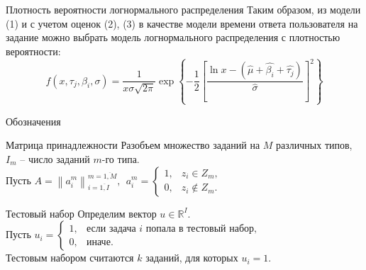 \documentclass[aspectratio=169]{beamer}
\newcommand{\norm}[1]{\left\lVert#1\right\rVert}
\begin{document}
    \begin{frame}{Плотность вероятности логнормального распределения}
            Таким образом, из модели (1) и с учетом оценок (2), (3) в качестве модели времени ответа пользователя на задание можно выбрать модель логнормального распределения с плотностью вероятности:
            \begin{equation}
                f(x,\tau_j,\beta_i,\sigma) = \dfrac{1}{x\sigma \sqrt{2\pi}}\exp \left\{ -\dfrac{1}{2} \left[ \dfrac{\ln x - (\hat{\mu} + \hat{\beta_i} + \hat{\tau_j})}{\hat{\sigma}} \right]^2 \right\}  
            \end{equation}
    \end{frame}


    \begin{frame}{Обозначения}
        \begin{block}{Матрица принадлежности}
            Разобъем множество заданий на $M$ различных типов, $I_m$ -- число заданий $m$-го типа.\\
            Пусть $A = \norm{ a_i^m }_{i=\overline{1,I}}^{m=\overline{1,M}},~~a_i^m =
                \begin{cases}
                    1, &z_i \in Z_m,\\
                    0, &z_i \notin Z_m.
                \end{cases}$
        \end{block}
    
        \begin{block}{Тестовый набор}
            Определим вектор $u\in\mathbb{R}^I$.\\
            Пусть $u_i =
                \begin{cases}
                    1, &\text{если задача $i$ попала в тестовый набор,}\\
                    0, &\text{иначе.}
                \end{cases}$\\
            Тестовым набором считаются $k$ заданий, для которых $u_i=1$.
        \end{block}
    \end{frame}
\end{document}
